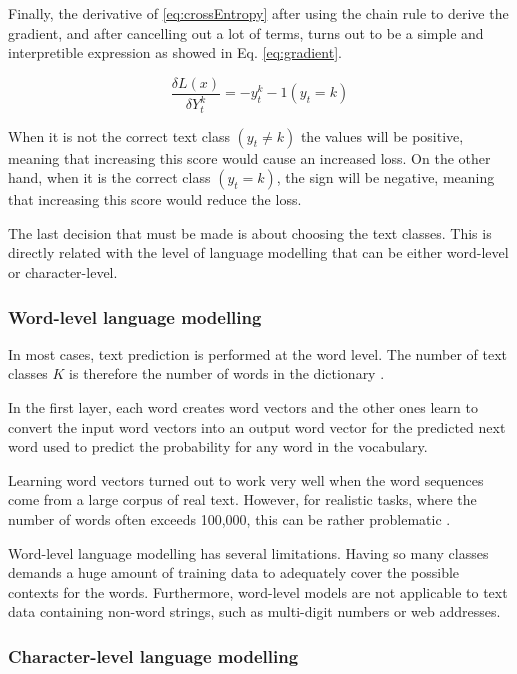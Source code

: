 Finally, the derivative of \ref{eq:crossEntropy} after using the chain rule to derive the gradient, and after cancelling out a lot of terms, turns out to be a simple and interpretible expression as showed in Eq. \ref{eq:gradient}.

\begin{equation} \label{eq:cgradient}
\frac{\delta L(x)}{\delta Y^k_t}=- y^k_t - 1 (y_t=k)
\end{equation}

When it is not the correct text class $(y_t \not= k)$ the values will be positive, meaning that increasing this score would cause an increased loss. On the other hand, when it is the correct class $(y_t = k)$, the sign will be negative, meaning that increasing this score would reduce the loss.


The last decision that must be made is about choosing the text classes. This is directly related with the level of language modelling that can be either word-level or character-level.

\subsubsection{Word-level language modelling}

In most cases, text prediction is performed at the word level. The number of text classes $K$ is therefore the number of words in the dictionary \cite{graves2013generating}.

In the first layer, each word creates word vectors and the other ones learn to convert the input word vectors into an output word vector for the predicted next word used to predict the probability for any word in the vocabulary. 

Learning word vectors turned out to work very well when the word sequences come from a large corpus of real text. However, for realistic tasks, where the number of words often exceeds 100,000, this can be rather problematic \cite{lecun2015deep}. 

Word-level language modelling has several limitations. Having so many classes demands a huge amount of training data to adequately cover the possible contexts for the words. Furthermore, word-level models are not applicable to text data containing non-word strings, such as multi-digit numbers or web addresses.\cite{graves2013generating}

\subsubsection{Character-level language modelling}


